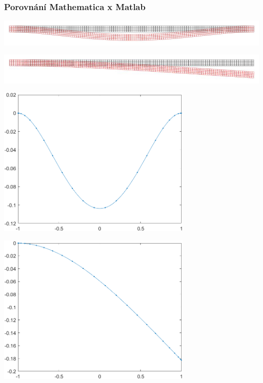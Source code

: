 \documentclass{beamer}
\begin{document}
\begin{frame}
	\frametitle{Porovnání Mathematica x Matlab}
	\begin{minipage}{\textwidth}
		\begin{minipage}[b]{0.5\textwidth}
			\centering
			\includegraphics[width=1\textwidth]{1}
		\end{minipage}
		\begin{minipage}[b]{0.5\textwidth}
			\centering
			\includegraphics[width=1\textwidth]{2}
		\end{minipage}
		\hfill
	\end{minipage}
	\begin{minipage}{\textwidth}
		\begin{minipage}[b]{0.5\textwidth}
			\centering
			\includegraphics[width=0.7\textwidth]{untitled1}
		\end{minipage}
		\begin{minipage}[b]{0.5\textwidth}
			\centering
			\includegraphics[width=0.7\textwidth]{untitled2}
		\end{minipage}
		\hfill
	\end{minipage}
\end{frame}
\end{document}
